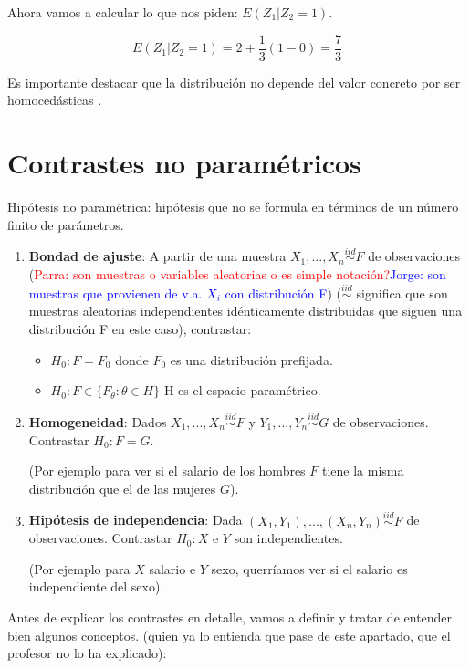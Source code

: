 \documentclass[nochap]{apuntes}
\begin{document}
\begin{example}
Ahora vamos a calcular lo que nos piden: $E(Z_1|Z_2=1)$.

\[E(Z_1|Z_2=1) = 2 + \frac{1}{3}(1-0) = \frac{7}{3}\]

Es importante destacar que la distribución no depende del valor concreto por ser homocedásticas .

\end{example}

\chapter{Contrastes no paramétricos}
Hipótesis no paramétrica: hipótesis que no se formula en términos de un número finito de parámetros.

\begin{enumerate}
\item \textbf{Bondad de ajuste}: A partir de una muestra $X_1,...,X_n \stackrel{iid}{\sim} F$ de observaciones ({\textcolor{red}{Parra: son muestras o variables aleatorias o es simple notación?}}{\textcolor{blue}{Jorge: son muestras que provienen de v.a. $X_i$ con distribución F}}) ($\stackrel{iid}{\sim}$ significa que son muestras aleatorias independientes idénticamente distribuidas que siguen una distribución F en este caso), contrastar:
\begin{itemize}
\item $H_0: F=F_0$ donde $F_0$ es una distribución prefijada.
\item $H_0: F \in \{F_{\theta} : \theta\in H\}$ H es el espacio paramétrico.
\end{itemize}
\item \textbf{ Homogeneidad}: Dados $X_1,...,X_n \stackrel{iid}{\sim} F$ y $Y_1,...,Y_n \stackrel{iid}{\sim} G$ de observaciones. Contrastar $H_0: F=G$.

(Por ejemplo para ver si el salario de los hombres $F$ tiene la misma distribución que el de las mujeres $G$).

\item \textbf{Hipótesis de independencia}: Dada $(X_1,Y_1),...,(X_n,Y_n) \stackrel{iid}{\sim} F$ de observaciones. Contrastar $H_0: X$ e $Y$ son independientes.

(Por ejemplo para $X$ salario e $Y$ sexo, querríamos ver si el salario es independiente del sexo).
\end{enumerate}

Antes de explicar los contrastes en detalle, vamos a definir y tratar de entender bien algunos conceptos. (quien ya lo entienda que pase de este apartado, que el profesor no lo ha explicado):
\end{document}
